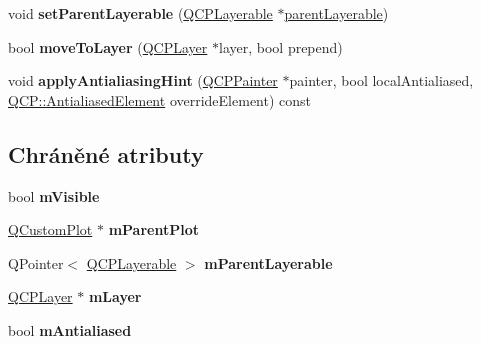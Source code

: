 \begin{DoxyCompactItemize}
\item 
\hypertarget{classQCPLayerable_aa23c893671f1f6744ac235cf2204cf3a}{}void {\bfseries set\+Parent\+Layerable} (\hyperlink{classQCPLayerable}{Q\+C\+P\+Layerable} $\ast$\hyperlink{classQCPLayerable_a98d79f5b716d45eac4347befe546d0ec}{parent\+Layerable})\label{classQCPLayerable_aa23c893671f1f6744ac235cf2204cf3a}

\item 
\hypertarget{classQCPLayerable_af94484cfb7cbbddb7de522e9be71d9a4}{}bool {\bfseries move\+To\+Layer} (\hyperlink{classQCPLayer}{Q\+C\+P\+Layer} $\ast$layer, bool prepend)\label{classQCPLayerable_af94484cfb7cbbddb7de522e9be71d9a4}

\item 
\hypertarget{classQCPLayerable_a62bd552d1a45aa9accb24b310542279e}{}void {\bfseries apply\+Antialiasing\+Hint} (\hyperlink{classQCPPainter}{Q\+C\+P\+Painter} $\ast$painter, bool local\+Antialiased, \hyperlink{namespaceQCP_ae55dbe315d41fe80f29ba88100843a0c}{Q\+C\+P\+::\+Antialiased\+Element} override\+Element) const \label{classQCPLayerable_a62bd552d1a45aa9accb24b310542279e}

\end{DoxyCompactItemize}
\subsection*{Chráněné atributy}
\begin{DoxyCompactItemize}
\item 
\hypertarget{classQCPLayerable_a62e3aed8427d6ce3ccf716f285106cb3}{}bool {\bfseries m\+Visible}\label{classQCPLayerable_a62e3aed8427d6ce3ccf716f285106cb3}

\item 
\hypertarget{classQCPLayerable_aa2a528433e44db02b8aef23c1f9f90ed}{}\hyperlink{classQCustomPlot}{Q\+Custom\+Plot} $\ast$ {\bfseries m\+Parent\+Plot}\label{classQCPLayerable_aa2a528433e44db02b8aef23c1f9f90ed}

\item 
\hypertarget{classQCPLayerable_a3291445a980053e2d17a21d15957624e}{}Q\+Pointer$<$ \hyperlink{classQCPLayerable}{Q\+C\+P\+Layerable} $>$ {\bfseries m\+Parent\+Layerable}\label{classQCPLayerable_a3291445a980053e2d17a21d15957624e}

\item 
\hypertarget{classQCPLayerable_aa38ec5891aff0f50b36fd63e9372a0cd}{}\hyperlink{classQCPLayer}{Q\+C\+P\+Layer} $\ast$ {\bfseries m\+Layer}\label{classQCPLayerable_aa38ec5891aff0f50b36fd63e9372a0cd}

\item 
\hypertarget{classQCPLayerable_a3ab45a4c76a3333ce42eb217a81733ec}{}bool {\bfseries m\+Antialiased}\label{classQCPLayerable_a3ab45a4c76a3333ce42eb217a81733ec}

\end{DoxyCompactItemize}
